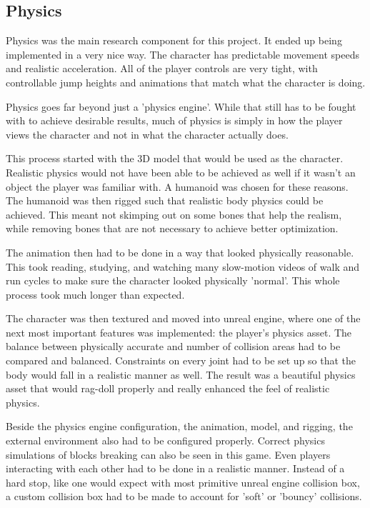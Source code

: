 \documentclass[conference,compsoc]{IEEEtran}
\begin{document}
\subsection{Physics}

Physics was the main research component for this project. It ended up being implemented in a very nice way. The character has predictable movement speeds and realistic acceleration. All of the player controls are very tight, with controllable jump heights and animations that match what the character is doing.

Physics goes far beyond just a 'physics engine'. While that still has to be fought with to achieve desirable results, much of physics is simply in how the player views the character and not in what the character actually does.

This process started with the 3D model that would be used as the character. Realistic physics would not have been able to be achieved as well if it wasn't an object the player was familiar with. A humanoid was chosen for these reasons. The humanoid was then rigged such that realistic body physics could be achieved. This meant not skimping out on some bones that help the realism, while removing bones that are not necessary to achieve better optimization.

The animation then had to be done in a way that looked physically reasonable. This took reading, studying, and watching many slow-motion videos of walk and run cycles to make sure the character looked physically 'normal'. This whole process took much longer than expected.

The character was then textured and moved into unreal engine, where one of the next most important features was implemented: the player's physics asset. The balance between physically accurate and number of collision areas had to be compared and balanced. Constraints on every joint had to be set up so that the body would fall in a realistic manner as well. The result was a beautiful physics asset that would rag-doll properly and really enhanced the feel of realistic physics.

Beside the physics engine configuration, the animation, model, and rigging, the external environment also had to be configured properly. Correct physics simulations of blocks breaking can also be seen in this game. Even players interacting with each other had to be done in a realistic manner. Instead of a hard stop, like one would expect with most primitive unreal engine collision box, a custom collision box had to be made to account for 'soft' or 'bouncy' collisions.
\end{document}
